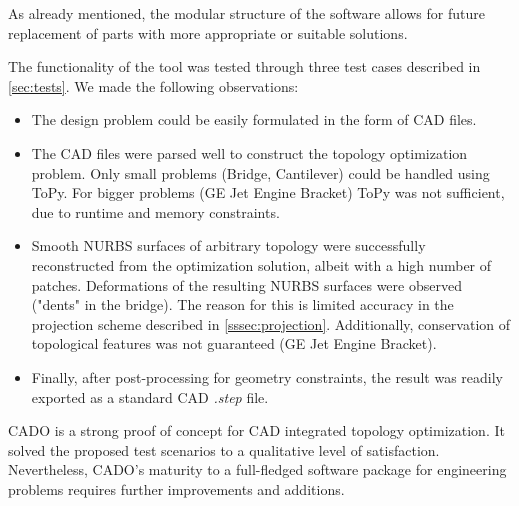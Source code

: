 As already mentioned, the modular structure of the software allows for future replacement of parts with more appropriate or suitable solutions. 

The functionality of the tool was tested through three test cases described in \autoref{sec:tests}. We made the following observations:
\begin{itemize}
\item The design problem could be easily formulated in the form of CAD files.
\item The CAD files were parsed well to construct the topology optimization problem. Only small problems (Bridge, Cantilever) could be handled using ToPy. For bigger problems (GE Jet Engine Bracket) ToPy was not sufficient, due to runtime and memory constraints.
\item Smooth NURBS surfaces of arbitrary topology were successfully reconstructed from the optimization solution, albeit with a high number of patches. Deformations of the resulting NURBS surfaces were observed ("dents" in the bridge). The reason for this is limited accuracy in the projection scheme described in \autoref{sssec:projection}. Additionally, conservation of topological features was not guaranteed (GE Jet Engine Bracket).
\item Finally, after post-processing for geometry constraints, the result was readily exported as a standard CAD \emph{.step} file.
\end{itemize}
CADO is a strong proof of concept for CAD integrated topology optimization. It solved the proposed test scenarios to a qualitative level of satisfaction. Nevertheless, CADO's maturity to a full-fledged software package for engineering problems requires further improvements and additions.
